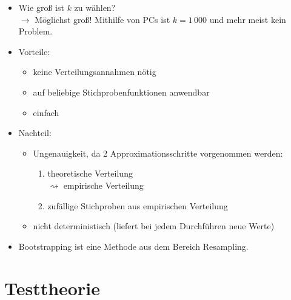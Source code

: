 \documentclass{scrreprt}
\begin{document}
\begin{itemize}
\item Wie groß ist $k$ zu wählen?\\
$\to$ Möglichst groß! Mithilfe von PCs ist $k=1\,000$ und mehr meist kein Problem.
\item Vorteile:
\begin{itemize}
\item keine Verteilungsannahmen nötig
\item auf beliebige Stichprobenfunktionen anwendbar
\item einfach
\end{itemize}
\item Nachteil:
\begin{itemize}
\item Ungenauigkeit, da 2 Approximationsschritte vorgenommen werden:
\begin{enumerate}
\item theoretische Verteilung \\
$\rightsquigarrow$ empirische Verteilung
\item zufällige Stichproben aus empirischen Verteilung
\end{enumerate}
\item nicht deterministisch (liefert bei jedem Durchführen neue Werte)
\end{itemize}
\item Bootstrapping ist eine Methode aus dem Bereich Resampling.
\end{itemize}

\section{Testtheorie}
\end{document}
